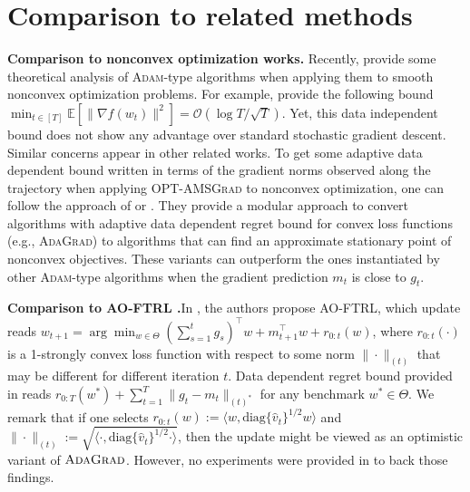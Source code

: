 \documentclass[twoside]{article}
\begin{document}
\vspace{-0.05in}
\section{Comparison to related methods} \label{sec:related}
\vspace{-0.05in}

\textbf{Comparison to nonconvex optimization works.}\hspace{0.1in}
Recently, \citep{ZRSKK18,CLSH19,WWB18,ZTYCG18,ZS18,LO18} provide some theoretical analysis of \textsc{Adam}-type algorithms when applying them to smooth nonconvex optimization problems. 
For example, \citep{CLSH19} provide the following bound $\min_{t \in [T]} \mathbb{E}[\| \nabla f(w_t) \|^2 ] = \mathcal{O}(\log T / \sqrt{T}) $.
Yet, this data independent bound does not show any advantage over standard stochastic gradient descent. 
Similar concerns appear in other related works.
To get some adaptive data dependent bound written in terms of the gradient norms observed along the trajectory when applying  \textsc{OPT-AMSGrad} to nonconvex optimization, one can follow the approach of \citep{Princeton18} or \citep{CYYZC19}.
They provide a modular approach to convert algorithms with adaptive data dependent regret bound for convex loss functions (e.g., \textsc{AdaGrad}) to algorithms that can find an approximate stationary point of nonconvex objectives. 
These variants can outperform the ones instantiated by other \textsc{Adam}-type algorithms when the gradient prediction $m_t$ is close to $g_t$.

\textbf{Comparison to AO-FTRL \citep{MY16}.}\hspace{0.1in}In \citep{MY16}, the authors propose AO-FTRL, which update reads $w_{t+1} = \arg\min_{{w \in \Theta}} ( \sum_{s=1}^t g_s )^{\top}  w + m_{t+1}^\top w + r_{0:t}(w) $, where $r_{0:t}(\cdot)$ is a 1-strongly convex loss function with respect to some norm $\| \cdot\|_{(t)}$ that may be different for different iteration $t$. 
Data dependent regret bound provided in \citep{MY16} reads $r_{{0:T}}(w^*) + \sum_{t=1}^T \| g_t - m_t \|_{(t)^*}$ for any benchmark $w^{*} \in \Theta$. 
We remark that if one selects $r_{0:t}(w) := \langle w, \text{diag}\{\hat{v}_t\}^{1/2} w \rangle$  and $\| \cdot \|_{(t)}:=  \sqrt{ \langle \cdot, \text{diag}\{\hat{v}_t\}^{1/2} \cdot \rangle }$, then the update might be viewed as an optimistic variant of $\textsc{AdaGrad}$. 
However, no experiments were provided in \citep{MY16} to back those findings.
\end{document}
